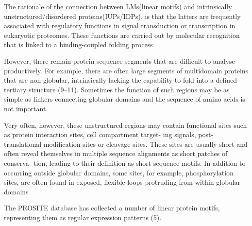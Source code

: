The rationale of the connection between LMs(linear motifs) and intrinsically unstructured/disordered proteins(IUPs/IDPs), is that the latters are frequently associated with
regulatory functions in signal transduction or transcription in eukaryotic proteomes. These functions are carried out by molecular recognition that is linked to a binding-coupled
folding process




However, there remain protein sequence segments that are difficult to analyse productively. 
For example, there are often large segments of multidomain proteins that are non-globular, intrinsically lacking the capability to fold into a defined tertiary
structure (9–11). Sometimes the function of such regions may be as simple as linkers connecting globular domains and the sequence of amino acids is not important.

Very often, however, these unstructured regions may contain functional
sites such as protein interaction sites, cell compartment target-
ing signals, post-translational modification sites or cleavage
sites. These sites are usually short and often reveal themselves
in multiple sequence alignments as short patches of conserva-
tion, leading to their definition as short sequence motifs. In
addition to occurring outside globular domains, some sites, for
example, phosphorylation sites, are often found in exposed,
flexible loops protruding from within globular domains

The PROSITE database has collected a number of linear
protein motifs, representing them as regular expression
patterns (5).






